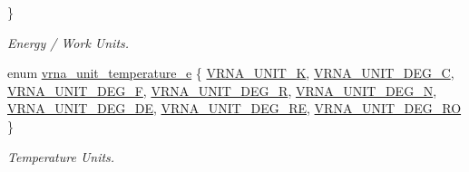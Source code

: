 \begin{DoxyCompactItemize}
 \}\begin{DoxyCompactList}\small\item\em Energy / Work Units. \end{DoxyCompactList}
\item 
enum \hyperlink{group__units_gadeca8d9e91ef85f1b652cc8aef63d7e4}{vrna\+\_\+unit\+\_\+temperature\+\_\+e} \{ \newline
\hyperlink{group__units_ggadeca8d9e91ef85f1b652cc8aef63d7e4a9b970a8dd20a98af000ac43e393a1d2d}{V\+R\+N\+A\+\_\+\+U\+N\+I\+T\+\_\+K}, 
\hyperlink{group__units_ggadeca8d9e91ef85f1b652cc8aef63d7e4a64b03f220d7256def88b3ed4a78440b2}{V\+R\+N\+A\+\_\+\+U\+N\+I\+T\+\_\+\+D\+E\+G\+\_\+C}, 
\hyperlink{group__units_ggadeca8d9e91ef85f1b652cc8aef63d7e4a56a659dc1a1e6c01a62c67ed8799fea9}{V\+R\+N\+A\+\_\+\+U\+N\+I\+T\+\_\+\+D\+E\+G\+\_\+F}, 
\hyperlink{group__units_ggadeca8d9e91ef85f1b652cc8aef63d7e4a71335b199e50c9ac773d4090018984bc}{V\+R\+N\+A\+\_\+\+U\+N\+I\+T\+\_\+\+D\+E\+G\+\_\+R}, 
\newline
\hyperlink{group__units_ggadeca8d9e91ef85f1b652cc8aef63d7e4ac3c83c399df537d213671bf6537bd400}{V\+R\+N\+A\+\_\+\+U\+N\+I\+T\+\_\+\+D\+E\+G\+\_\+N}, 
\hyperlink{group__units_ggadeca8d9e91ef85f1b652cc8aef63d7e4a8b047fe5980c99270a587e668c2a2d8b}{V\+R\+N\+A\+\_\+\+U\+N\+I\+T\+\_\+\+D\+E\+G\+\_\+\+DE}, 
\hyperlink{group__units_ggadeca8d9e91ef85f1b652cc8aef63d7e4a94dce0a5f2e13a3a3fd554d6b0cd6395}{V\+R\+N\+A\+\_\+\+U\+N\+I\+T\+\_\+\+D\+E\+G\+\_\+\+RE}, 
\hyperlink{group__units_ggadeca8d9e91ef85f1b652cc8aef63d7e4a405589efa7e654a6cfe148a992adc1d0}{V\+R\+N\+A\+\_\+\+U\+N\+I\+T\+\_\+\+D\+E\+G\+\_\+\+RO}
 \}\begin{DoxyCompactList}\small\item\em Temperature Units. \end{DoxyCompactList}
\end{DoxyCompactItemize}
